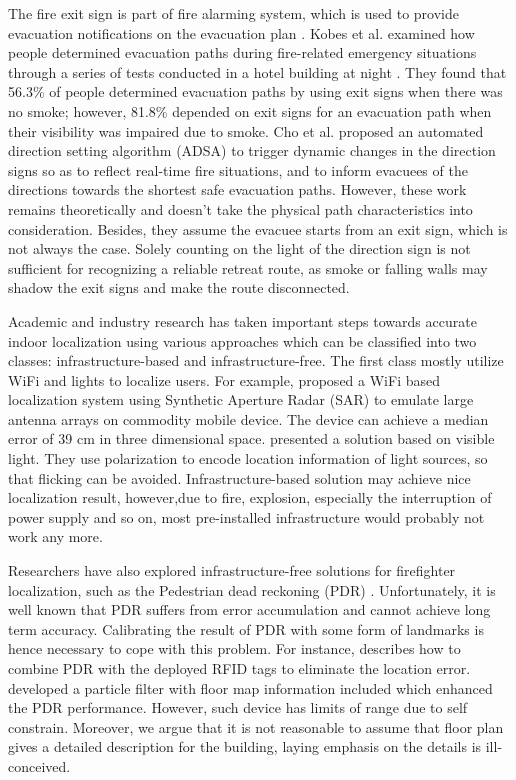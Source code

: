 \documentclass[conference]{IEEEtran}
\begin{document}
The fire exit sign is part of fire alarming system, which is used to provide evacuation notifications on the evacuation plan \cite{pu2005evacuation}. Kobes et al. examined how people determined evacuation paths during fire-related emergency situations through a series of tests conducted in a hotel building at night \cite{kobes2010way}. They found that 56.3\% of people determined evacuation paths by using exit signs when there was no smoke; however, 81.8\% depended on exit signs for an evacuation path when their visibility was impaired due to smoke. Cho et al. \cite{cho2015automated} proposed an automated direction setting algorithm (ADSA) to trigger dynamic changes in the direction signs so as to reflect real-time fire situations, and to inform evacuees of the directions towards the shortest safe evacuation paths. However, these work remains theoretically and doesn't take the physical path characteristics into consideration. Besides, they assume the evacuee starts from an exit sign, which is not always the case. Solely counting on the light of the direction sign is not sufficient for recognizing a reliable retreat route, as smoke or falling walls may shadow the exit signs and make the route disconnected.


Academic and industry research has taken important steps towards accurate indoor localization using various approaches which can be classified into two classes: infrastructure-based and infrastructure-free. The first class mostly utilize WiFi and lights to localize users. For example, \cite{kumar2014accurate} proposed a WiFi based localization system using Synthetic Aperture Radar (SAR) to emulate large antenna arrays on commodity mobile device. The device can achieve a median error of 39 cm in three dimensional space. \cite{yang2015wearables} presented a solution based on visible light. They use polarization to encode location information of light sources, so that flicking can be avoided. Infrastructure-based solution may achieve nice localization result, however,due to fire, explosion, especially the interruption of power supply and so on, most pre-installed infrastructure would probably not work any more. 

Researchers have also explored infrastructure-free solutions for firefighter localization, such as the Pedestrian dead reckoning (PDR) \cite{nilsson2012foot} \cite{jimenez2009comparison} \cite{beauregard2006pedestrian} . Unfortunately, it is well known that PDR suffers from error accumulation and cannot achieve long term accuracy. Calibrating the result of PDR with some form of landmarks is hence necessary to cope with this problem. For instance, \cite{ruiz2012accurate} describes how to combine PDR with the deployed RFID tags to eliminate the location error. \cite{beauregard2008indoor} developed a particle filter with floor map information included which enhanced the PDR performance. However, such device has limits of range due to self constrain. Moreover, we argue that it is not reasonable to assume that floor plan gives a detailed description for the building, laying emphasis on the details is ill-conceived.
\end{document}
